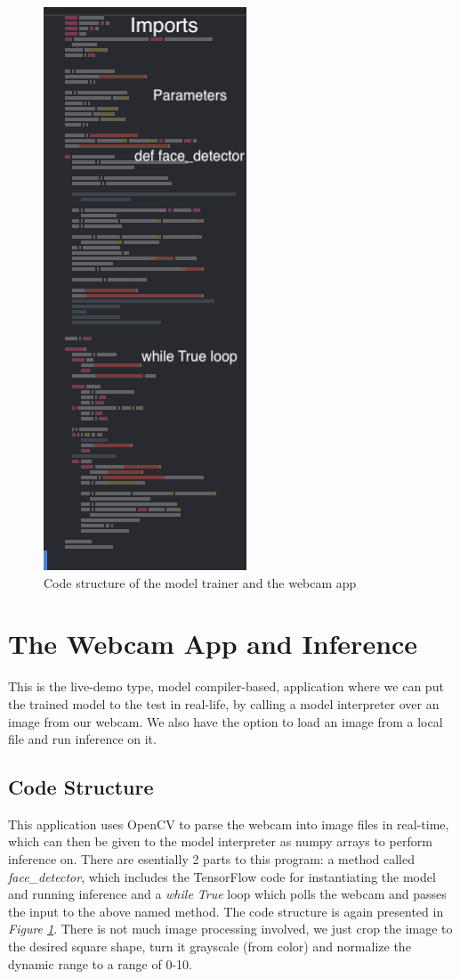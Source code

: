 \begin{figure}
    \includegraphics[height = 18 cm]{images/code_body_xcode_webcam.png}
    \caption{Code structure of the model trainer and the webcam app}
    \label{xcode_struct}
\end{figure}

\section{The Webcam App and Inference}
This is the live-demo type, model compiler-based, application where we can put the trained model to the test in real-life, by calling a model interpreter over an image from our webcam. We also have the option to load an image from a local file and run inference on it. 
\subsection{Code Structure}
This application uses OpenCV to parse the webcam into image files in real-time, which can then be given to the model interpreter as numpy arrays to perform inference on. There are esentially 2 parts to this program: a method called \textit{face\_detector}, which includes the TensorFlow code for instantiating the model and running inference and a \textit{while True} loop which polls the webcam and passes the input to the above named method. The code structure is again presented in \textit{Figure \ref{xcode_struct}}. There is not much image processing involved, we just crop the image to the desired square shape, turn it grayscale (from color) and normalize the dynamic range to a range of 0-10.

